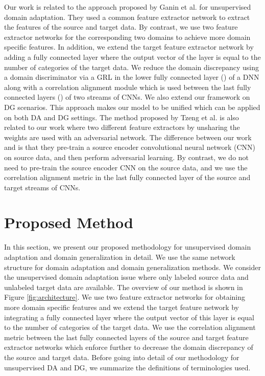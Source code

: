 \documentclass[review]{elsarticle}
\begin{document}
Our work is related to the approach proposed by Ganin et al. \cite{pmlr-v37-ganin15} for unsupervised domain adaptation. They used a common feature extractor network to extract the features of the source and target data. By contrast, we use two feature extractor networks for the corresponding two domains to achieve more domain specific features. In addition, we extend the target feature extractor network by adding a fully connected layer where the output vector of the layer is equal to the number of categories of the target data. We reduce the domain discrepancy using a domain discriminator via a GRL in the lower fully connected layer () of a DNN along with a correlation alignment module which is used between the last fully connected layers () of two streams of CNNs. We also extend our framework on DG scenarios. This approach makes our model to be unified which can be applied on both DA and DG settings. The method proposed by Tzeng et al. \cite{8099799} is also related to our work where two different feature extractors by unsharing the weights are used with an adversarial network. The difference between our work and \cite{8099799} is that they pre-train a source encoder convolutional neural network (CNN) on source data, and then perform adversarial learning. By contrast, we do not need to pre-train the source encoder CNN on the source data, and we use the correlation alignment metric in the last fully connected layer of the source and target streams of CNNs.









\section{Proposed Method}

In this section, we present our proposed methodology for unsupervised domain adaptation and domain generalization in detail. We use the same network structure for domain adaptation and domain generalization methods. We consider the unsupervised domain adaptation issue where only labeled source data and unlabeled target data are available. The overview of our method is shown in Figure \ref{fig:architecture}. We use two feature extractor networks for obtaining more domain specific features and we extend the target feature network by integrating a fully connected layer where the output vector of this layer is equal to the number of categories of the target data. We use the correlation alignment metric between the last fully connected layers of the source and target feature extractor networks which enforce further to decrease the domain discrepancy of the source and target data. Before going into detail of our methodology for unsupervised DA and DG, we summarize the definitions of terminologies used.
\end{document}
